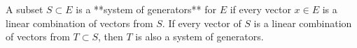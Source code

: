 A subset $S \subset E$ is a **system of generators** for $E$ if every vector $x \in E$ is a linear combination of vectors from $S$. If every vector of $S$ is a linear combination of vectors from $T \subset S$, then $T$ is also a system of generators.
